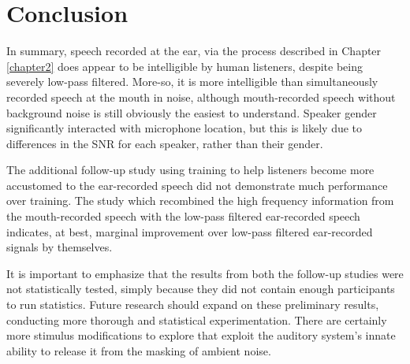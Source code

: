 \section{Conclusion}

In summary, speech recorded at the ear, via the process described in Chapter \ref{chapter2} does appear to be intelligible by human listeners, despite being severely low-pass filtered.  More-so, it is more intelligible than simultaneously recorded speech at the mouth in noise, although mouth-recorded speech without background noise is still obviously the easiest to understand.  Speaker gender significantly interacted with microphone location, but this is likely due to differences in the SNR for each speaker, rather than their gender.  

The additional follow-up study using training to help listeners become more accustomed to the ear-recorded speech did not demonstrate much performance over training.  The study which recombined the high frequency information from the mouth-recorded speech with the low-pass filtered ear-recorded speech indicates, at best, marginal improvement over low-pass filtered ear-recorded signals by themselves.

It is important to emphasize that the results from both the follow-up studies were not statistically tested, simply because they did not contain enough participants to run statistics.  Future research should expand on these preliminary results, conducting more thorough and statistical experimentation.  There are certainly more stimulus modifications to explore that exploit the auditory system's innate ability to release it from the masking of ambient noise.

